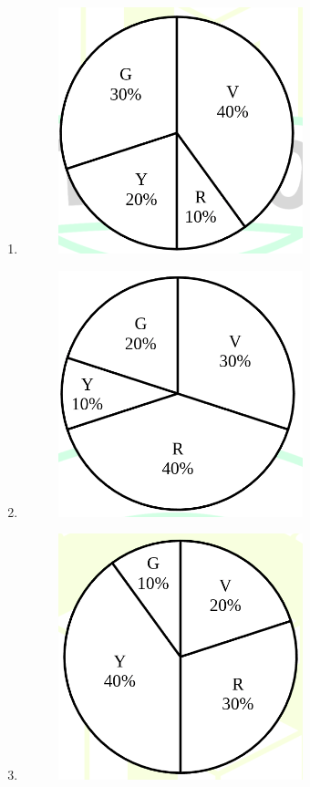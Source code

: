 \documentclass[journal,12pt,onecolumn]{IEEEtran}
\theoremstyle{remark}
\begin{document}
\begin{enumerate}
\begin{enumerate}
\item  \begin{figure}
    \centering
    \includegraphics[width=0.5\columnwidth]{figs/2.png}
    \caption{}
    \label{fig:2}
\end{figure}

\item  \begin{figure}
    \centering
    \includegraphics[width=0.5\columnwidth]{figs/3.png}
    \caption{}
    \label{fig:3}
\end{figure}

\item  \begin{figure}
    \centering
    \includegraphics[width=0.5\columnwidth]{figs/4.png}
    \caption{}
    \label{fig:4}
\end{figure}


\end{enumerate}
\end{enumerate}
\end{document}

